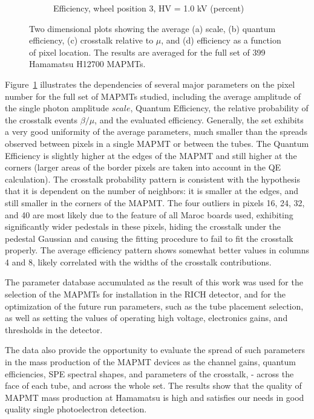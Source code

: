 \begin{figure}[t!]
\begin{subfigure}[c]{0.48\linewidth}
		\caption{Efficiency, wheel position 3, HV = 1.0 kV (percent)}
		\vspace{0mm}
	\end{subfigure}%
	\caption{Two dimensional plots showing the average (a) scale, (b) quantum efficiency, (c) crosstalk relative to $\mu$, and (d) efficiency as a function of pixel location. The results are averaged for the full set of 399 Hamamatsu H12700 MAPMTs.}
	\label{fig:2d_avg_fit_results}
\end{figure}


Figure~\ref{fig:2d_avg_fit_results} illustrates the dependencies of several major parameters on the pixel number for the full set of MAPMTs studied, including the average amplitude of the single photon amplitude $scale$, Quantum Efficiency, the relative probability of the crosstalk events $\beta/\mu$, and the evaluated efficiency. Generally, the set exhibits a very good uniformity of the average parameters, much smaller than the spreads observed between pixels in a single MAPMT or between the tubes. The Quantum Efficiency is slightly higher at the edges of the MAPMT and still higher at the corners (larger areas of the border pixels are taken into account in the QE calculation). The crosstalk probability pattern is consistent with the hypothesis that it is dependent on the number of neighbors: it is smaller at the edges, and still smaller in the corners of the MAPMT. The four outliers in pixels 16, 24, 32, and 40 are most likely due to the feature of all Maroc boards used, exhibiting significantly wider pedestals in these pixels, hiding the crosstalk under the pedestal Gaussian and causing the fitting procedure to fail to fit the crosstalk properly. The average efficiency pattern shows somewhat better values in columns 4 and 8, likely correlated with the widths of the crosstalk contributions.    



The parameter database accumulated as the result of this work was used for the selection of the MAPMTs for installation in the RICH detector, and for the optimization of the future run parameters, such as the tube placement selection, as well as setting the values of operating high voltage, electronics gains, and thresholds in the detector.


The data also provide the opportunity to evaluate the spread of such parameters in the mass production of the MAPMT devices as the channel gains, quantum efficiencies, SPE spectral shapes, and parameters of the crosstalk, - across the face of each tube, and across the whole set. The results show that the quality of MAPMT mass production at Hamamatsu is high and satisfies our needs in good quality single photoelectron detection.



